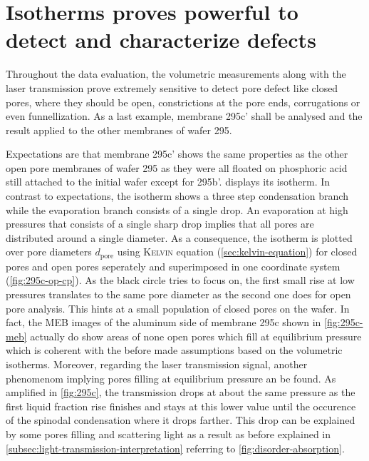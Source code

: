 \documentclass[../thesis.tex]{subfiles}
\begin{document}
            


      \section{Isotherms proves powerful to detect and characterize defects}
      \label{sec:theory-and-defects}

        

        Throughout the data evaluation, the volumetric measurements along with the laser transmission prove extremely sensitive to detect pore defect like closed pores, where they should be open, constrictions at the pore ends, corrugations or even funnellization. As a last example, membrane 295c' shall be analysed and the result applied to the other membranes of wafer 295.

        Expectations are that membrane 295c' shows the same properties as the other open pore membranes of wafer 295 as they were all floated on phosphoric acid still attached to the initial wafer except for 295b'.  displays its isotherm. In contrast to expectations, the isotherm shows a three step condensation branch while the evaporation branch consists of a single drop. An evaporation at high pressures that consists of a single sharp drop implies that all pores are distributed around a single diameter. As a consequence, the isotherm is plotted over pore diameters $d_\mathrm{pore}$ using \textsc{Kelvin} equation (\cref{sec:kelvin-equation}) for closed pores and open pores seperately and superimposed in one coordinate system (\cref{fig:295c-op-cp}). As the black circle tries to focus on, the first small rise at low pressures translates to the same pore diameter as the second one does for open pore analysis. This hints at a small population of closed pores on the wafer. In fact, the MEB images of the aluminum side of membrane 295c shown in \cref{fig:295c-meb} actually do show areas of none open pores which fill at equilibrium pressure which is coherent with the before made assumptions based on the volumetric isotherms. Moreover, regarding the laser transmission signal, another phenomenom implying pores filling at equilibrium pressure an be found. As amplified in \cref{fig:295c}, the transmission drops at about the same pressure as the first liquid fraction rise finishes and stays at this lower value until the occurence of the spinodal condensation where it drops farther. This drop can be explained by some pores filling and scattering light as a result as before explained in \cref{subsec:light-transmission-interpretation} referring to \cref{fig:disorder-absorption}.
\end{document}
